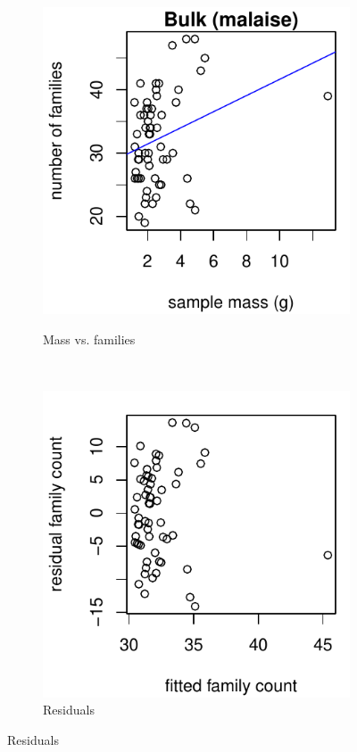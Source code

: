 \documentclass[10pt,letterpaper,twocolumn]{article}
\begin{document}
\begin{figure}[h]
	\centering
	\begin{subfigure}[b]{0.15\textwidth}
		\caption{Mass vs. families}
		\includegraphics[width=\textwidth]{plots/bulk/2015_bulk_malaise_scatter.pdf}
		\label{fig:bulk_malaise_scatter}
	\end{subfigure}
	~
	\begin{subfigure}[b]{0.15\textwidth}
		\caption{Residuals}
		\includegraphics[width=\textwidth]{plots//bulk/2015_bulk_malaise_residual.pdf}

\end{subfigure}
\end{figure}
\end{document}
